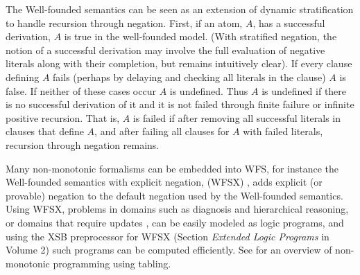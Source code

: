 The Well-founded semantics can be seen as an extension of dynamic
stratification to handle recursion through negation.  First, if an
atom, $A$, has a successful derivation, $A$ is true in the
well-founded model.  (With stratified negation, the notion of a
successful derivation may involve the full evaluation of negative
literals along with their completion, but remains intuitively clear).
If every clause defining $A$ fails (perhaps by delaying and checking
all literals in the clause) $A$ is false.  If neither of these cases
occur $A$ is undefined.  Thus $A$ is undefined if there is no
successful derivation of it and it is not failed through finite
failure or infinite positive recursion.  That is, $A$ is failed if
after removing all successful literals in clauses that define $A$, and
after failing all clauses for $A$ with failed literals, recursion
through negation remains.

Many non-monotonic formalisms can be embedded into WFS, for instance
the Well-founded semantics with explicit negation, (WFSX)
\cite{ADP95}, adds explicit (or provable) negation to the default
negation used by the Well-founded semantics.  Using WFSX, problems in
domains such as diagnosis and hierarchical reasoning, or domains that
require updates \cite{Leit97}, can be easily modeled as logic
programs, and using the XSB preprocessor for WFSX (Section {\it
Extended Logic Programs} in Volume 2) such programs can be computed
efficiently.  See \cite{Swif99a} for an overview of non-monotonic
programming using tabling.

